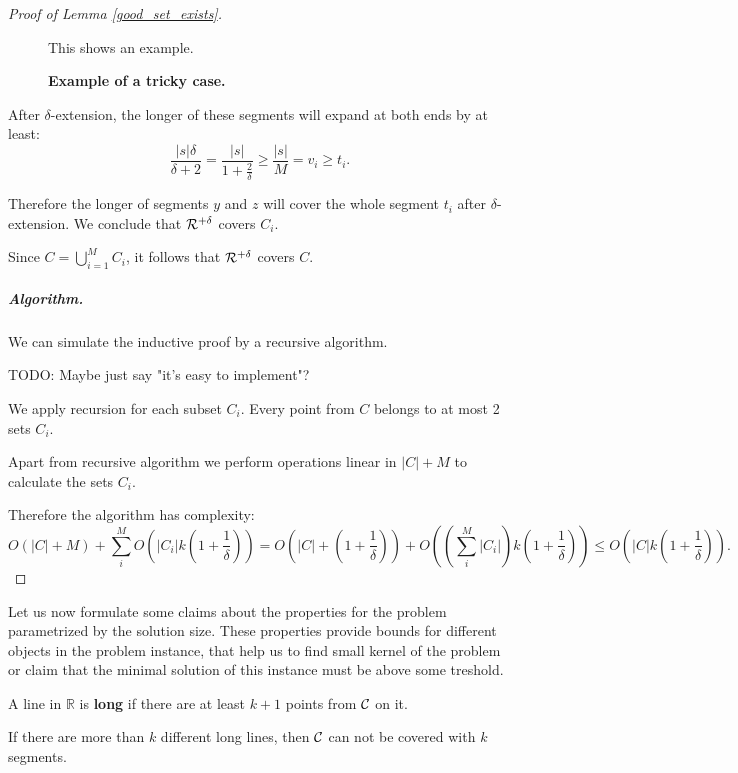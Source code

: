 \begin{proof}[Proof of Lemma \ref{good_set_exists}]
\begin{figure}[h]
\centering
\def\svgwidth{\columnwidth}

\caption{\textbf{Example of a tricky case.}}
This shows an example.
\label{fig:fpt_tricky_case}
\end{figure}

After $\delta$-extension, the longer of these segments will
expand at both ends by at least:
$$\frac{|s|\delta}{\delta+2} = \frac{|s|}{1+\frac{2}{\delta}} \ge \frac{|s|}{M} = v_i \ge t_i.$$

Therefore the longer of segments $y$ and $z$ will cover the whole segment $t_i$
after $\delta$-extension. We conclude that $\mathcal{R}^{+\delta}$ covers $C_i$.

Since $C = \bigcup_{i=1}^M C_i$,
it follows that $\mathcal{R}^{+\delta}$ covers $C$.


\subparagraph{Algorithm.}

We can simulate the inductive proof by a recursive algorithm.

TODO: Maybe just say "it's easy to implement"?

We apply recursion for each subset $C_i$. Every point
from $C$ belongs to at most 2 sets $C_i$.

Apart from recursive algorithm we perform operations linear in
$|C| + M$ to calculate the sets $C_i$.

Therefore the algorithm has complexity:
$$O(|C|+M) + \sum_i^M O(|C_i|k(1+\frac{1}{\delta})) = 
O(|C| + (1+\frac{1}{\delta})) + O((\sum_i^M |C_i|)k(1+\frac{1}{\delta}))
\le O(|C|k(1+\frac{1}{\delta})).$$

\end{proof}

Let us now formulate some claims about the
properties for the problem parametrized by the solution size.
These properties provide bounds for different
objects in the problem instance,
that help us to find small kernel of the problem
or claim that the minimal
solution of this instance must be above some treshold.

\begin{defi}
A line in $\mathbb{R}$ is \textbf{long} if there are at least $k+1$ points from $\mathcal{C}$ on it.
\end{defi}

\begin{claim}
\label{few_long_lines}
If there are more than $k$ different long lines, then 
$\mathcal{C}$ can not be covered with $k$ segments.
\end{claim}

